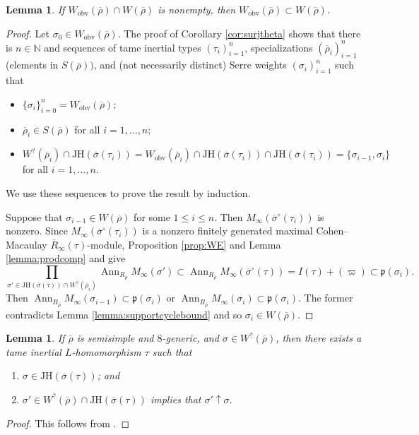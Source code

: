\documentclass[oneside,a4paper,english, 11pt]{amsart}
\theoremstyle{plain}
\theoremstyle{plain}
\theoremstyle{plain}
\newtheorem{lemma}[thm]{Lemma}
\theoremstyle{plain}
\theoremstyle{plain}
\theoremstyle{plain}
\theoremstyle{definition}
\theoremstyle{definition}
\theoremstyle{definition}
\theoremstyle{remark}
\numberwithin{equation}{section}
\newcommand{\fp}{\mathfrak{p}}
\newcommand{\bN}{\mathbb{N}}
\newcommand{\JH}{\mathrm{JH}}
\newcommand{\rhobar}{\overline{\rho}}
\newcommand{\ovl}[1]{\overline{#1}}
\DeclareMathOperator{\Ann}{Ann}
\begin{document}
\begin{lemma}\label{lemma:obvmodular}
If $W_{\mathrm{obv}}(\rhobar) \cap W(\rhobar)$ is nonempty, then $W_{\mathrm{obv}}(\rhobar) \subset W(\rhobar)$. 
\end{lemma}
\begin{proof}
Let $\sigma_0 \in W_{\mathrm{obv}}(\rhobar)$. 
The proof of Corollary \ref{cor:surjtheta} shows that there is $n\in \bN$ and sequences of tame inertial types $(\tau_i)_{i=1}^n$, specializations $(\rhobar_i)_{i=1}^n$ (elements in $S(\rhobar))$, and (not necessarily distinct) Serre weights $(\sigma_i)_{i=1}^n$ such that 
\begin{itemize}
\item $\{\sigma_i\}_{i=0}^{n} = W_{\mathrm{obv}}(\rhobar)$; 
\item $\rhobar_i \in S(\rhobar)$ for all $i = 1,\ldots, n$; 
\item $W^?(\rhobar_i) \cap \JH(\ovl{\sigma}(\tau_i)) = W_{\mathrm{obv}}(\rhobar_i) \cap \JH(\ovl{\sigma}(\tau_i)) \cap \JH(\ovl{\sigma}(\tau_i)) = \{\sigma_{i-1},\sigma_i\}$ for all $i = 1,\ldots, n$. 
\end{itemize}
We use these sequences to prove the result by induction. 

Suppose that $\sigma_{i-1} \in W(\rhobar)$ for some $1 \leq i \leq n$. 
Then $M_\infty(\ovl{\sigma}^\circ(\tau_i))$ is nonzero. 
Since $M_\infty(\ovl{\sigma}^\circ(\tau_i))$ is a nonzero finitely generated maximal Cohen--Macaulay $\ovl{R}_\infty(\tau)$-module, Proposition \ref{prop:WE} and Lemma \ref{lemma:prodcomp} and give 
\[
\prod_{\sigma' \in \JH(\ovl{\sigma}(\tau)) \cap W^?(\rhobar_i)} \Ann_{R_{\rhobar}} M_\infty(\sigma') \subset \Ann_{R_{\rhobar}} M_\infty(\ovl{\sigma}^\circ(\tau)) = I(\tau) +(\varpi)\subset \fp(\sigma_i).
\]
Then $\Ann_{R_{\rhobar}} M_\infty(\sigma_{i-1}) \subset \fp(\sigma_i)$ or $\Ann_{R_{\rhobar}} M_\infty(\sigma_i) \subset \fp(\sigma_i)$. 
The former contradicts Lemma \ref{lemma:supportcyclebound} and so $\sigma_i \in W(\rhobar)$. 
\end{proof}

\begin{lemma}\label{lemma:mintype}
If $\rhobar$ is semisimple and $8$-generic, and $\sigma \in W^?(\rhobar)$, then there exists a tame inertial $L$-homomorphism $\tau$ such that 
\begin{enumerate}
\item $\sigma \in \JH(\ovl{\sigma}(\tau))$; and
\item $\sigma' \in W^?(\rhobar) \cap \JH(\ovl{\sigma}(\tau))$ implies that $\sigma' \uparrow \sigma$. 
\end{enumerate}
\end{lemma}
\begin{proof}
This follows from \cite[Lemma 3.5.9]{LLLM2}. 
\end{proof}
\end{document}
